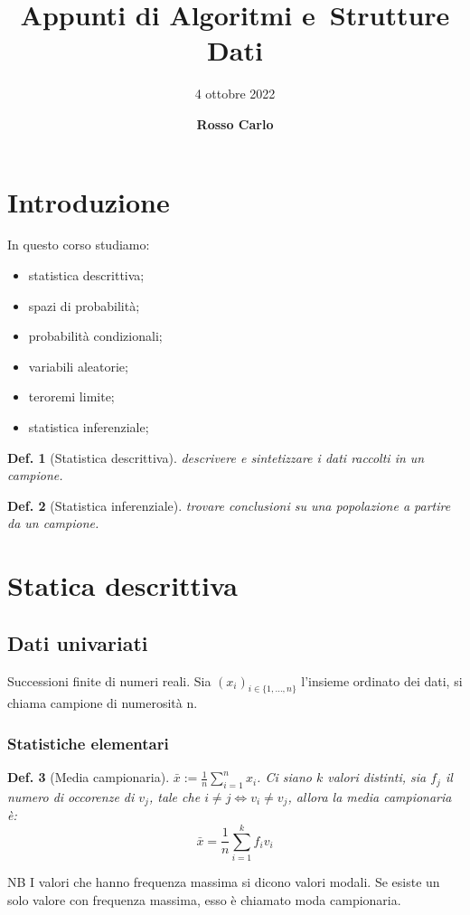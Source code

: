 \documentclass{article}
\title{\vspace{2cm}\textbf{Appunti di Algoritmi e\ Strutture Dati}}
\author{\vspace{3mm}4 ottobre 2022}
\date{\vspace{3mm} \textbf{Rosso Carlo}}
\newtheorem{definition}{Def.}[section]
\begin{document}
\begin{titlepage}
	\maketitle
	\thispagestyle{empty}
\end{titlepage}
\tableofcontents
\newpage

\section{Introduzione}
In questo corso studiamo:
\begin{itemize}
	\item statistica descrittiva;
	\item spazi di probabilità;
	\item probabilità condizionali;
	\item variabili aleatorie;
	\item teroremi limite;
	\item statistica inferenziale;
\end{itemize}

\begin{definition}[Statistica descrittiva] 
	descrivere e sintetizzare i dati raccolti in un campione.
\end{definition}

\begin{definition}[Statistica inferenziale] trovare conclusioni su una popolazione a
partire da un campione.
\end{definition}

\section{Statica descrittiva}

\subsection{Dati univariati} 
Successioni finite di numeri reali. Sia $(x_i)_{i
\in \{1, \dots, n\}}$ l'insieme ordinato dei dati, si chiama campione di
numerosità n.

\subsubsection{Statistiche elementari}

\begin{definition}[Media campionaria] $\bar{x} := \frac{1}{n} \sum_{i=1}^n x_i$. Ci
siano $k$ valori distinti, sia $f_j$ il numero di occorenze di $v_j$, tale che
$i \neq j \iff v_i \neq v_j$, allora la media campionaria è:
\begin{equation}
\bar{x} = \frac{1}{n} \sum_{i=1}^k f_i v_i
\end{equation}
\end{definition}
NB I valori che hanno frequenza massima si dicono valori modali. Se esiste un
solo valore con frequenza massima, esso è chiamato moda campionaria.
\end{document}

